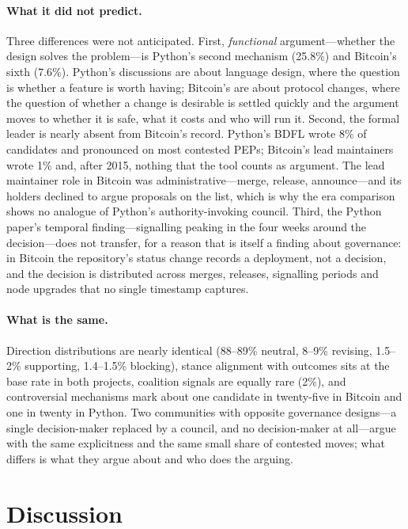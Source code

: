 \documentclass[sigconf,screen]{acmart}
\begin{document}
\paragraph{What it did not predict.} Three differences were not anticipated. First, \emph{functional} argument---whether the design solves the problem---is Python's second mechanism (25.8\%) and Bitcoin's sixth (7.6\%). Python's discussions are about language design, where the question is whether a feature is worth having; Bitcoin's are about protocol changes, where the question of whether a change is desirable is settled quickly and the argument moves to whether it is safe, what it costs and who will run it. Second, the formal leader is nearly absent from Bitcoin's record. Python's BDFL wrote 8\% of candidates and pronounced on most contested PEPs; Bitcoin's lead maintainers wrote 1\% and, after 2015, nothing that the tool counts as argument. The lead maintainer role in Bitcoin was administrative---merge, release, announce---and its holders declined to argue proposals on the list, which is why the era comparison shows no analogue of Python's authority-invoking council. Third, the Python paper's temporal finding---signalling peaking in the four weeks around the decision---does not transfer, for a reason that is itself a finding about governance: in Bitcoin the repository's status change records a deployment, not a decision, and the decision is distributed across merges, releases, signalling periods and node upgrades that no single timestamp captures.

\paragraph{What is the same.} Direction distributions are nearly identical (88--89\% neutral, 8--9\% revising, 1.5--2\% supporting, 1.4--1.5\% blocking), stance alignment with outcomes sits at the base rate in both projects, coalition signals are equally rare (2\%), and controversial mechanisms mark about one candidate in twenty-five in Bitcoin and one in twenty in Python. Two communities with opposite governance designs---a single decision-maker replaced by a council, and no decision-maker at all---argue with the same explicitness and the same small share of contested moves; what differs is what they argue about and who does the arguing.

\section{Discussion}
\end{document}
